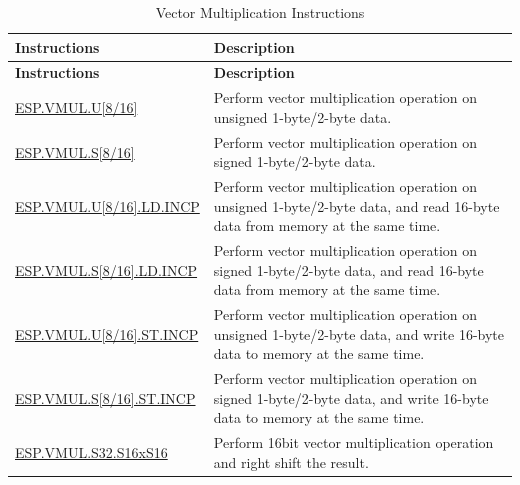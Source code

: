 \begin{longtable}[c]{|l|m{11cm}|}
    \caption{Vector Multiplication Instructions}
    \label{tab:pie-vmul-instructions}\\
    \hline
    \rowcolor{lightgray}
    \textbf{Instructions} & \textbf{Description} \\\hline
    \endfirsthead
    \rowcolor{lightgray}
    \textbf{Instructions} & \textbf{Description} \\\hline
    \endhead
    \endfoot
    
    \hyperref[instruction:ESPVMULU8]{ESP.VMUL.U[8/16]} & Perform vector multiplication operation on unsigned 1-byte/2-byte data.
    \\\hline
    \hyperref[instruction:ESPVMULS8]{ESP.VMUL.S[8/16]} & Perform vector multiplication operation on signed 1-byte/2-byte data.
    \\\hline
    \hyperref[instruction:ESPVMULU8LDINCP]{ESP.VMUL.U[8/16].LD.INCP} & Perform vector multiplication operation on unsigned 1-byte/2-byte data, and read 16-byte data from memory at the same time.
    \\\hline
    \hyperref[instruction:ESPVMULS8LDINCP]{ESP.VMUL.S[8/16].LD.INCP} & Perform vector multiplication operation on signed 1-byte/2-byte data, and read 16-byte data from memory at the same time.
    \\\hline
    \hyperref[instruction:ESPVMULU8STINCP]{ESP.VMUL.U[8/16].ST.INCP} & Perform vector multiplication operation on unsigned 1-byte/2-byte data, and write 16-byte data to memory at the same time.
    \\\hline
    \hyperref[instruction:ESPVMULS8STINCP]{ESP.VMUL.S[8/16].ST.INCP} & Perform vector multiplication operation on signed 1-byte/2-byte data, and write 16-byte data to memory at the same time.
    \\\hline
  \hyperref[instruction:ESPVMULS32S16XS16]{ESP.VMUL.S32.S16xS16} & Perform 16bit vector multiplication operation and right shift the result.
    \\\hline
    
\end{longtable}
